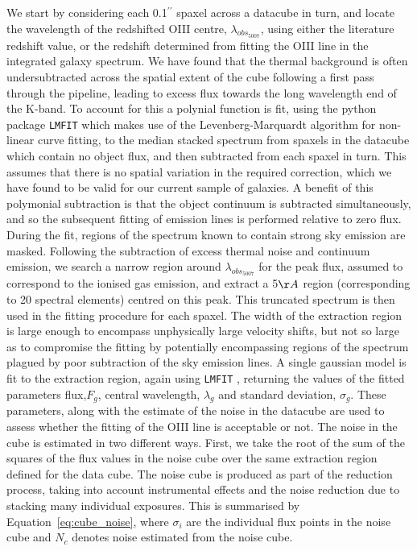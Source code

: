 \documentclass[a4paper,fleqn,usenatbib]{mn2e}
\begin{document}
We start by considering each 0.1$^{\prime\prime}$ spaxel across a datacube in turn, and locate the wavelength of the redshifted OIII centre, $\lambda_{obs_{5007}}$, using either the literature redshift value, or the redshift determined from fitting the OIII line in the integrated galaxy spectrum.
We have found that the thermal background is often undersubtracted across the spatial extent of the cube following a first pass through the pipeline, leading to excess flux towards the long wavelength end of the K-band.
To account for this a polynial function is fit, using the python package {\tt LMFIT} \citep{Newville2014} which makes use of the Levenberg-Marquardt algorithm for non-linear curve fitting, to the median stacked spectrum from spaxels in the datacube which contain no object flux, and then subtracted from each spaxel in turn.
This assumes that there is no spatial variation in the required correction, which we have found to be valid for our current sample of galaxies.
A benefit of this polymonial subtraction is that the object continuum is subtracted simultaneously, and so the subsequent fitting of emission lines is performed relative to zero flux. 
During the fit, regions of the spectrum known to contain strong sky emission are masked.
Following the subtraction of excess thermal noise and continuum emission, we search a narrow region around $\lambda_{obs_{5007}}$ for the peak flux, assumed to correspond to the ionised gas emission, and extract a 5$\AA$ region (corresponding to 20 spectral elements) centred on this peak.
This truncated spectrum is then used in the fitting procedure for each spaxel.
The width of the extraction region is large enough to encompass unphysically large velocity shifts, but not so large as to compromise the fitting by potentially encompassing regions of the spectrum plagued by poor subtraction of the sky emission lines.
A single gaussian model is fit to the extraction region, again using {\tt LMFIT} \citep{Newville2014}, returning the values of the fitted parameters flux,$F_{g}$, central wavelength, $\lambda_{g}$ and standard deviation, $\sigma_{g}$.
These parameters, along with the estimate of the noise in the datacube are used to assess whether the fitting of the OIII line is acceptable or not. 
The noise in the cube is estimated in two different ways. 
First, we take the root of the sum of the squares of the flux values in the noise cube over the same extraction region defined for the data cube.
The noise cube is produced as part of the reduction process, taking into account instrumental effects and the noise reduction due to stacking many individual exposures.
This is summarised by Equation~\ref{eq:cube_noise}, where $\sigma _{i}$ are the individual flux points in the noise cube and $N_{c}$ denotes noise estimated from the noise cube.
\end{document}
